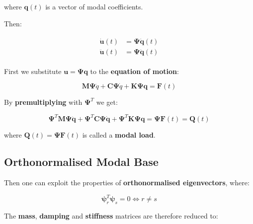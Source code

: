 \documentclass[10pt,b5paper,titlepage]{book}
\newenvironment{ematrix}
{
    \begin{eqnarray}
        \begin{aligned}
}
{
        \end{aligned}
    \end{eqnarray}
}
\begin{document}
where $ \mathbf{q}(t) $ is a vector of modal coefficients.

Then:

\begin{ematrix}
    \dot{\mathbf{u}}(t) &= \mathbf{\Psi} \dot{\mathbf{q}}(t) \\
    \ddot{\mathbf{u}}(t) &= \mathbf{\Psi} \ddot{\mathbf{q}}(t)
\end{ematrix}

First we substitute $ \mathbf{u} = \mathbf{\Psi}\mathbf{q} $ to the
\textbf{equation of motion}:

\begin{equation}
    \mathbf{M} \mathbf{\Psi} \ddot{q} +
    \mathbf{C} \mathbf{\Psi} \dot{q} +
    \mathbf{K}\mathbf{\Psi}\mathbf{q}
    = \mathbf{F}(t)
\end{equation}

By \textbf{premultiplying} with $ \mathbf{\Psi}^T $ we get:

\begin{equation}
    \mathbf{\Psi}^T \mathbf{M} \mathbf{\Psi} \ddot{\mathbf{q}} +
    \mathbf{\Psi}^T \mathbf{C} \mathbf{\Psi} \dot{\mathbf{q}} +
    \mathbf{\Psi}^T \mathbf{K} \mathbf{\Psi} \mathbf{q} =
    \mathbf{\Psi}\mathbf{F}(t) = \mathbf{Q}(t)
\end{equation}

where $ \mathbf{Q}(t) = \mathbf{\Psi} \mathbf{F}(t) $ is called a \textbf{modal load}.

\subsection{Orthonormalised Modal Base}

Then one can exploit the properties of \textbf{orthonormalised eigenvectors}, where:

\begin{equation}
    \mathbf{\psi}_r^T \mathbf{\psi}_s = 0 \Leftrightarrow r \neq s
\end{equation}

The \textbf{mass}, \textbf{damping} and \textbf{stiffness} matrices are therefore
reduced to:
\end{document}
